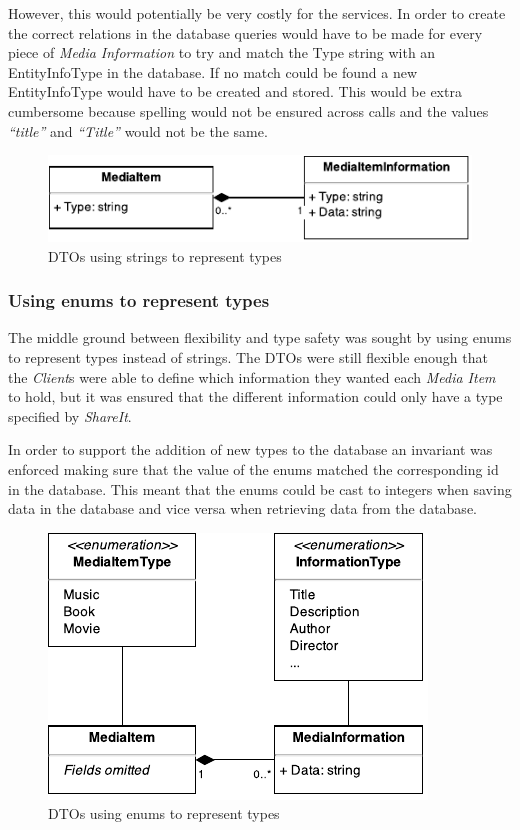 \documentclass[../report.tex]{subfiles}
\begin{document}
However, this would potentially be very costly for the services. In order to create the correct relations in the database queries would have to be made for every piece of \textit{Media Information} to try and match the Type string with an EntityInfoType in the database. If no match could be found a new EntityInfoType would have to be created and stored. This would be extra cumbersome because spelling would not be ensured across calls and the values \textit{``title''} and \textit{``Title''} would not be the same.
 
\begin{figure}[!h]
\label{fig:dto_types_string}
\centering
\includegraphics[scale=0.9]{../img/typesAsString.pdf}
\caption{DTOs using strings to represent types}
\end{figure}

\subsubsection{Using enums to represent types}
The middle ground between flexibility and type safety was sought by using enums to represent types instead of strings.
The DTOs were still flexible enough that the \textit{Client}s were able to define which information they wanted each \textit{Media Item} to hold, but it was ensured that the different information could only have a type specified by \textit{ShareIt}.

In order to support the addition of new types to the database an invariant was enforced making sure that the value of the enums matched the corresponding id in the database. 
This meant that the enums could be cast to integers when saving data in the database and vice versa when retrieving data from the database. 

\begin{figure}[!h]
\label{fig:dto_types_enum}
\centering
\includegraphics[scale=0.9]{../img/typesAsEnum.pdf}
\caption{DTOs using enums to represent types}
\end{figure}
\end{document}
